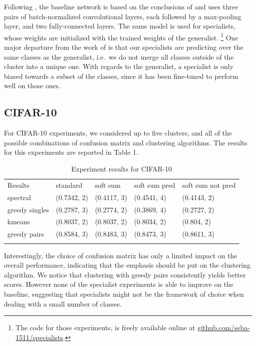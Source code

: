 \documentclass[12pt]{article}
\begin{document}
Following \cite{binaryconnect}, the baseline network is based on the
conclusions of \cite{vgg} and uses three pairs of batch-normalized
convolutional layers, each followed by a max-pooling layer, and two
fully-connected layers. The same model is used for specialists, whose
weights are initialized with the trained weights of the generalist.
\footnote{The code for those experiments, is freely available online at
  \href{http://www.github.com/seba-1511/specialists}{github.com/seba-1511/specialists}.}
One major departure from the work of \cite{darkknowledge} is that our
specialists are predicting over the same classes as the generalist,
i.e.~we do not merge all classes outside of the cluster into a unique
one. With regards to the generalist, a specialist is only biased towards
a subset of the classes, since it has been fine-tuned to perform well on
those ones.

\subsection{CIFAR-10}\label{cifar-10}

For CIFAR-10 experiments, we considered up to five clusters, and all of
the possible combinations of confusion matrix and clustering algorithms.
The results for this experiments are reported in Table 1.

\begin{longtable}[c]{@{}lllll@{}}
\toprule\addlinespace
Results & standard & soft sum & soft sum pred & soft sum not pred
\\\addlinespace
\midrule\endhead
spectral & (0.7342, 2) & (0.4117, 3) & (0.4541, 4) & (0.4143, 2)
\\\addlinespace
greedy singles & (0.2787, 3) & (0.2774, 2) & (0.3869, 4) & (0.2727, 2)
\\\addlinespace
kmeans & (0.8037, 2) & (0.8037, 2) & (0.8034, 2) & (0.804, 2)
\\\addlinespace
greedy pairs & (0.8584, 3) & (0.8483, 3) & (0.8473, 3) & (0.8611, 3)
\\\addlinespace
\bottomrule
\addlinespace
\caption{Experiment results for CIFAR-10}
\end{longtable}

Interestingly, the choice of confusion matrix has only a limited impact
on the overall performance, indicating that the emphasis should be put
on the clustering algorithm. We notice that clustering with greedy pairs
consistently yields better scores. However none of the specialist
experiments is able to improve on the baseline, suggesting that
specialists might not be the framework of choice when dealing with a
small number of classes.
\end{document}
